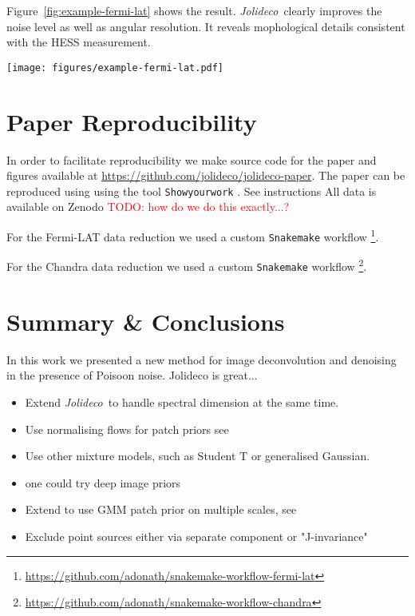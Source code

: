 \documentclass[twocolumn]{aastex631}
\newcommand{\jolideco}{\textit{Jolideco}~}
\newcommand{\todo}[1]{\textcolor{red}{TODO: #1}\PackageWarning{TODO:}{#1!}}
\begin{document}
    Figure~\ref{fig:example-fermi-lat} shows the result. \jolideco clearly improves the noise level as well as angular resolution. It reveals mophological details consistent with the HESS measurement.
    
    \begin{figure*}
        \begin{centering}
            \texttt{[image: figures/example-fermi-lat.pdf]}
            \caption{
                The \jolideco method applied to the supernova remnant \textit{RX J0852.0-4622} or \textit{Vela Junior}. The left image shows the counts above \qty[mode = text]{10}{GeV}. The different event classes are stacked into a single image.
                The image in the center show the flux reconstructed by the \jolideco methods. The image on the right shows the normalised residuals.
            }
            \label{fig:example-fermi-lat}
        \end{centering}
    \end{figure*}

    \section{Paper Reproducibility}
    In order to facilitate reproducibility we make source code for the paper and figures  available at \url{https://github.com/jolideco/jolideco-paper}.
    The paper can be reproduced using using the tool \texttt{Showyourwork} \citep{Luger2021}. See instructions 
    All data is available on Zenodo \todo{how do we do this exactly...?}
    
    For the Fermi-LAT data reduction we used a custom \texttt{Snakemake} workflow \footnote{\url{https://github.com/adonath/snakemake-workflow-fermi-lat}}.

    For the Chandra data reduction we used a custom \texttt{Snakemake} workflow \footnote{\url{https://github.com/adonath/snakemake-workflow-chandra}}.
        
    
    \section{Summary \& Conclusions}
    In this work we presented a new method for image deconvolution and denoising in the presence of Poisoon noise.
    Jolideco is great...

    \begin{itemize}
        \item Extend \jolideco to handle spectral dimension at the same time.
        \item Use normalising flows for patch priors see \cite{Altekrueger2022}
        \item Use other mixture models, such as Student T or generalised Gaussian. 
        \item one could try deep image priors \citep{Ulyanov2017}
        \item Extend to use GMM patch prior on multiple scales, see \cite{Papyan2015}
        \item Exclude point sources either via separate component or "J-invariance"
    \end{itemize}
    
\end{document}
